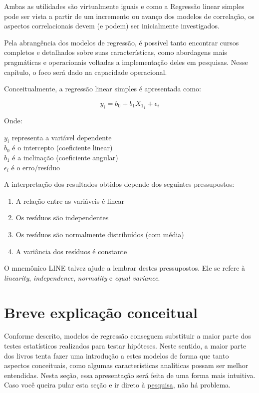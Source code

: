 \documentclass[
]{book}
\providecommand{\tightlist}{%
  \setlength{\itemsep}{0pt}\setlength{\parskip}{0pt}}
\begin{document}
Ambas as utilidades são virtualmente iguais e como a Regressão linear simples pode ser vista a partir de um incremento ou avanço dos modelos de correlação, os aspectos correlacionais devem (e podem) ser inicialmente investigados.

Pela abrangência dos modelos de regressão, é possível tanto encontrar cursos completos e detalhados sobre suas características, como abordagens mais pragmáticas e operacionais voltadas a implementação deles em pesquisas. Nesse capítulo, o foco será dado na capacidade operacional.

Conceitualmente, a regressão linear simples é apresentada como:

\[y_i = b_0 + b_1X{_1}_i + \epsilon_{i}\]

Onde:

\(y_i\) representa a variável dependente\\
\(b_0\) é o intercepto (coeficiente linear)\\
\(b_1\) é a inclinação (coeficiente angular)\\
\(\epsilon_{i}\) é o erro/resíduo

A interpretação dos resultados obtidos depende dos seguintes pressupostos:

\begin{enumerate}
\def\labelenumi{(\roman{enumi})}
\tightlist
\item
  A relação entre as variáveis é linear
\item
  Os resíduos são independentes\\
\item
  Os resíduos são normalmente distribuídos (com média)\\
\item
  A variância dos resíduos é constante
\end{enumerate}

O mnemônico LINE talvez ajude a lembrar destes pressupostos. Ele se refere à \emph{linearity}, \emph{independence}, \emph{normality} e \emph{equal variance}.

\hypertarget{breve-explicauxe7uxe3o-conceitual}{%
\section{Breve explicação conceitual}\label{breve-explicauxe7uxe3o-conceitual}}

Conforme descrito, modelos de regressão conseguem substituir a maior parte dos testes estatísticos realizados para testar hipóteses. Neste sentido, a maior parte dos livros tenta fazer uma introdução a estes modelos de forma que tanto aspectos conceituais, como algumas características analíticas possam ser melhor entendidas. Nesta seção, essa apresentação será feita de uma forma mais intuitiva. Caso você queira pular esta seção e ir direto à \protect\hyperlink{ux5cux23pesquisa}{pesquisa}, não há problema.
\end{document}
